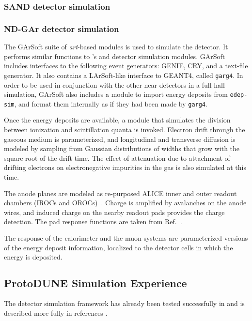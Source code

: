 \documentclass[../main-v1.tex]{subfiles}
\begin{document}
\subsubsection{SAND detector simulation}

\subsubsection{ND-GAr detector simulation}
\label{sec:usecases_ndgardetsim}

The GArSoft suite of {\it art}-based modules is used to simulate the  detector.  It performs similar functions to 's  and detector simulation modules.  GArSoft includes interfaces to the following event generators:  GENIE, CRY, and a text-file generator.  It also contains a LArSoft-like interface to GEANT4, called {\tt garg4}.  In order to be used in conjunction with the other near detectors in a full hall simulation, GArSoft also includes a module to import energy deposits from {\tt edep-sim}, and format them internally as if they had been made by {\tt garg4}.

Once the energy deposits are available, a module that simulates the division between ionization and scintillation quanta is invoked.  Electron drift through the gaseous medium is parameterized, and longitudinal and transverse diffusion is modeled by sampling from Gaussian distributions of widths that grow with the square root of the drift time.  The effect of attenuation due to attachment of drifting electrons on electronegative impurities in the gas is also simulated at this time. 

The anode planes are modeled as re-purposed ALICE inner and outer readout chambers (IROCs and OROCs)~\cite{Dellacasa:2000bm}.  Charge is amplified by avalanches on the anode wires, and induced charge on the nearby readout pads provides the charge detection.  The pad response functions are taken from Ref.~\cite{Dellacasa:2000bm}.

The response of the calorimeter and the muon systems are parameterized versions of the energy deposit information, localized to the detector cells in which the energy is deposited.

\subsection{ProtoDUNE Simulation Experience}

The detector simulation framework has already been tested successfully in  and is described more fully in references \cite{DUNE:2021hwx,DUNE:2020cqd}.
\end{document}
